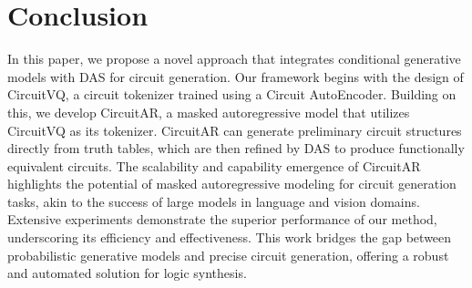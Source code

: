 \section{Conclusion}
In this paper, we propose a novel approach that integrates conditional generative models with DAS for circuit generation. 
Our framework begins with the design of CircuitVQ, a circuit tokenizer trained using a Circuit AutoEncoder. 
Building on this, we develop CircuitAR, a masked autoregressive model that utilizes CircuitVQ as its tokenizer. 
CircuitAR can generate preliminary circuit structures directly from truth tables, which are then refined by DAS to produce functionally equivalent circuits. 
The scalability and capability emergence of CircuitAR highlights the potential of masked autoregressive modeling for circuit generation tasks, akin to the success of large models in language and vision domains. 
Extensive experiments demonstrate the superior performance of our method, underscoring its efficiency and effectiveness. 
This work bridges the gap between probabilistic generative models and precise circuit generation, offering a robust and automated solution for logic synthesis.